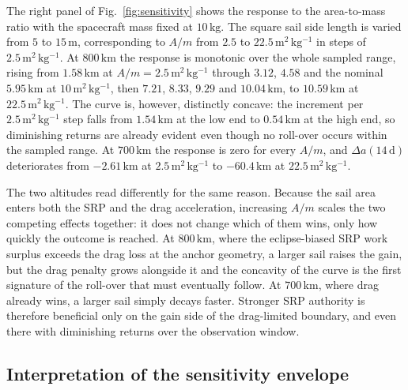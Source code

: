 \noindent The right panel of Fig.~\ref{fig:sensitivity} shows the response to the area-to-mass ratio with the spacecraft mass fixed at \(10\,\mathrm{kg}\). The square sail side length is varied from \(5\) to \(15\,\mathrm{m}\), corresponding to \(A/m\) from \(2.5\) to \(22.5\,\mathrm{m^2\,kg^{-1}}\) in steps of \(2.5\,\mathrm{m^2\,kg^{-1}}\). At \(800\,\mathrm{km}\) the response is monotonic over the whole sampled range, rising from \(1.58\,\mathrm{km}\) at \(A/m = 2.5\,\mathrm{m^2\,kg^{-1}}\) through \(3.12\), \(4.58\) and the nominal \(5.95\,\mathrm{km}\) at \(10\,\mathrm{m^2\,kg^{-1}}\), then \(7.21\), \(8.33\), \(9.29\) and \(10.04\,\mathrm{km}\), to \(10.59\,\mathrm{km}\) at \(22.5\,\mathrm{m^2\,kg^{-1}}\). The curve is, however, distinctly concave: the increment per \(2.5\,\mathrm{m^2\,kg^{-1}}\) step falls from \(1.54\,\mathrm{km}\) at the low end to \(0.54\,\mathrm{km}\) at the high end, so diminishing returns are already evident even though no roll-over occurs within the sampled range. At \(700\,\mathrm{km}\) the response is zero for every \(A/m\), and \(\Delta a(14\,\mathrm{d})\) deteriorates from \(-2.61\,\mathrm{km}\) at \(2.5\,\mathrm{m^2\,kg^{-1}}\) to \(-60.4\,\mathrm{km}\) at \(22.5\,\mathrm{m^2\,kg^{-1}}\).
\vspace{5pt}
\par\noindent The two altitudes read differently for the same reason. Because the sail area enters both the SRP and the drag acceleration, increasing \(A/m\) scales the two competing effects together: it does not change which of them wins, only how quickly the outcome is reached. At \(800\,\mathrm{km}\), where the eclipse-biased SRP work surplus exceeds the drag loss at the anchor geometry, a larger sail raises the gain, but the drag penalty grows alongside it and the concavity of the curve is the first signature of the roll-over that must eventually follow. At \(700\,\mathrm{km}\), where drag already wins, a larger sail simply decays faster. Stronger SRP authority is therefore beneficial only on the gain side of the drag-limited boundary, and even there with diminishing returns over the observation window.

\vspace{5pt}
\subsection{\textbf{Interpretation of the sensitivity envelope}}

